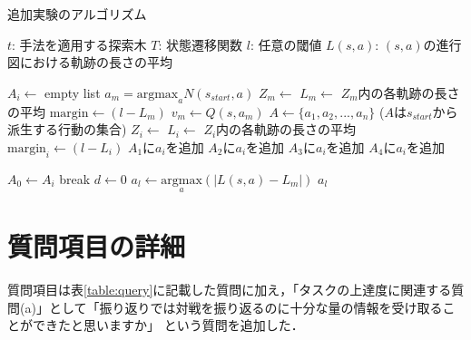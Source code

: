 \begin{algorithm}
    \small
    \caption{追加実験のアルゴリズム}
    \label{alg:myalg-add}
    \begin{algorithmic}[1]
        \State $t$: 手法を適用する探索木
        \State $T$: 状態遷移関数
        \State $l$: 任意の閾値
        \State $L(s, a)$: $(s, a)$の進行図における軌跡の長さの平均

        
        
       
               $A_i \gets $ empty list
           \EndFor
           \State $a_m = \textrm{argmax}_a N(s_{start}, a)$
           \State $Z_m \gets$ 
           \State $L_m \gets $ $Z_m$内の各軌跡の長さの平均
           \State $\textrm{margin} \gets (l-L_m)$
           \State $v_m \gets Q(s, a_m)$
           \State $A \gets \{a_1, a_2, ..., a_n\}$ ($A$は$s_{start}$から派生する行動の集合)
            \State $Z_i \gets$ 
            \State $L_i \gets $ $Z_i$内の各軌跡の長さの平均
            \State $\textrm{margin}_i \gets (l-L_i)$
                    \State $A_1$に$a_i$を追加
                \Else
                    \State $A_2$に$a_i$を追加
                \EndIf
            \Else
                    \State $A_3$に$a_i$を追加
                \Else
                    \State $A_4$に$a_i$を追加
                \EndIf

            \EndIf
           \EndFor

                   \State $A_0 \gets A_i$
                   \State break
                \EndIf
           \EndFor
           \State $d \gets 0$
           \State $a_l \gets {\underset{a}{\textrm{argmax}}} (|L(s,a)-L_m|)$
           \State \Return $a_l$
        \EndFunction
    \end{algorithmic}
\end{algorithm}












\section{質問項目の詳細}
質問項目は表\ref{table:query}に記載した質問に加え，「タスクの上達度に関連する質問(a)」として「振り返りでは対戦を振り返るのに十分な量の情報を受け取ることができたと思いますか」
という質問を追加した．

